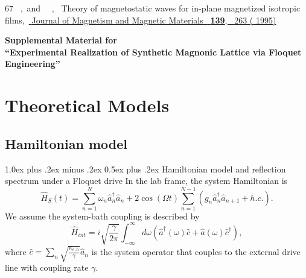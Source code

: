 \documentclass[
twocolumn,

superscriptaddress,









 amsmath,amssymb,
 aps,


prl,




]{revtex4-2}
\makeatletter
\providecommand{\subsubsection}{}
\renewcommand{\subsubsection}{
  \@startsection{subsubsection}{3}{0pt}
    {1.0ex plus .2ex minus .2ex}
    {0.5ex plus .2ex}
    {\normalfont\normalsize\bfseries\filcenter}
}
\renewcommand{\thesection}{\arabic{section}}
\renewcommand{\thesubsection}{\thesection.\arabic{subsection}}
\renewcommand{\thesubsubsection}{\thesubsection.\arabic{subsubsection}}
\newcommand{\opa}{\hat{a}}
\newcommand{\opad}{\hat{a}^\dagger}
\newcommand{\opc}{\hat{c}}
\newcommand{\opcd}{\hat{c}^\dagger}
\newcommand{\oph}{\hat{H}}
\makeatother
\begin{document}
\begin{thebibliography}{67}
  \BibitemOpen
   { {\ },\ and\  {\ },\ } { {Theory of magnetostatic waves for in-plane magnetized isotropic films},\ }\href {https://doi.org/10.1016/0304-8853(95)90006-3} { { {Journal of Magnetism and Magnetic Materials}\ }\textbf { {139}},\  {263} ( {1995})}
\end{thebibliography}









\onecolumngrid
\clearpage
\setcounter{section}{0}
\setcounter{figure}{0}
\setcounter{equation}{0}
\renewcommand{\thefigure}{S\arabic{figure}}
\renewcommand{\theequation}{S\arabic{equation}}
\renewcommand{\thesection}{S\arabic{section}}
\renewcommand{\thesubsection}{\thesection.\arabic{subsection}}
\renewcommand{\thesubsubsection}{\thesubsection.\arabic{subsubsection}}
\begin{center}
\textbf{\large Supplemental Material for\\[2pt]
``Experimental Realization of Synthetic Magnonic Lattice via Floquet Engineering''}
\end{center}
\vspace{1em}

\section{Theoretical Models}


\subsection{Hamiltonian model}

\subsubsection{Hamiltonian model and reflection spectrum under a Floquet drive}
In the lab frame, the system Hamiltonian is
\begin{equation}
	\oph_S(t) = \sum_{n=1}^N \omega_n \opad_n \opa_n + 2 \cos (\Omega t) \sum_{n=1}^{N-1} (g_n\opad_n \opa_{n+1} + h.c.) .
\end{equation}
We assume the system-bath coupling is described by
\begin{equation}
	\oph_{int} = i \sqrt{\frac{\gamma}{2\pi}} \int_{-\infty}^{\infty} d \omega (\opad(\omega) \opc + \opa(\omega) \opcd) ,
\end{equation}
where $\opc = \sum_n \sqrt{\frac{\kappa_{e,n}}{\gamma}} \opa_n$ is the system operator that couples to the external drive line with coupling rate $\gamma$.
\end{document}

